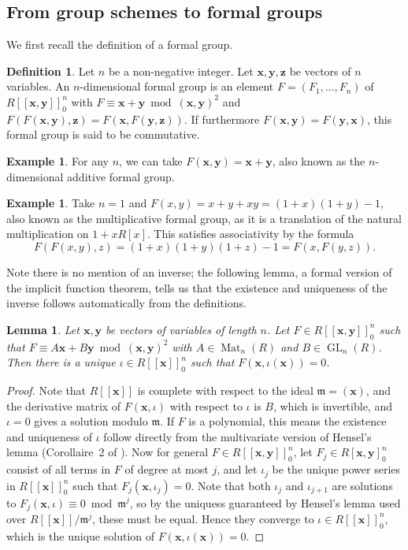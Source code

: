 \documentclass[12pt]{article}
\newcommand{\vx}{\mathbf{x}}
\newcommand{\vy}{\mathbf{y}}
\newcommand{\vz}{\mathbf{z}}
\newcommand{\m}{\mathfrak{m}}
\DeclareMathOperator{\GL}{GL}
\DeclareMathOperator{\Mat}{Mat}
\theoremstyle{plain}
\newtheorem{lem}[thm]{Lemma} %
\theoremstyle{definition}
\newtheorem{defn}[thm]{Definition} %
\newtheorem{exmp}[thm]{Example} %
\theoremstyle{remark}
\begin{document}
\subsection{From group schemes to formal groups}
We first recall the definition of a formal group.
\begin{defn}
\label{defn:formalgroup}
Let $n$ be a non-negative integer. Let $\vx,\vy,\vz$ be vectors of $n$ variables. An $n$-dimensional formal group is an element $F = (F_1,\dots,F_n)$ of $R[[\vx,\vy]]_0^n$ with $F \equiv \vx + \vy \bmod (\vx,\vy)^2$ and $F(F(\vx,\vy),\vz) = F(\vx,F(\vy,\vz))$. If furthermore $F(\vx,\vy) = F(\vy,\vx)$, this formal group is said to be commutative.
\end{defn}
\begin{exmp}
\label{exmp:ganformalgroup}
For any $n$, we can take $F(\vx,\vy) = \vx+ \vy$, also known as the $n$-dimensional additive formal group.
\end{exmp}
\begin{exmp}
\label{exmp:gmformalgroup}
Take $n=1$ and $F(x,y) = x + y + xy = (1+x)(1+y)-1$, also known as the multiplicative formal group, as it is a translation of the natural multiplication on $1 + xR[x]$. This satisfies associativity by the formula \[F(F(x,y),z) = (1+x)(1+y)(1+z)-1 = F(x,F(y,z)).\]
\end{exmp}
Note there is no mention of an inverse; the following lemma, a formal version of the implicit function theorem, tells us that the existence and uniqueness of the inverse follows automatically from the definitions.
\begin{lem}
\label{lem:implicitfunction}
Let $\vx,\vy$ be vectors of variables of length $n$. Let $F \in R[[\vx,\vy]]_0^n$ such that $F \equiv A\vx + B\vy \bmod (\vx,\vy)^2$ with $A \in \Mat_n(R)$ and $B \in \GL_n(R)$. Then there is a unique $\iota \in R[[\vx]]_0^n$ such that $F(\vx,\iota(\vx)) = 0$. 
\end{lem}
\begin{proof}
Note that $R[[\vx]]$ is complete with respect to the ideal $\m = (\vx)$, and the derivative matrix of $F(\vx,\iota)$ with respect to $\iota$ is $B$, which is invertible, and $\iota = 0$ gives a solution modulo $\m$. If $F$ is a polynomial, this means the existence and uniqueness of $\iota$ follow directly from the multivariate version of Hensel's lemma (Corollaire~2 of \cite[III,4.5]{BourbakiCA}).  Now for general $F \in R[[\vx,\vy]]_0^n$, let $F_j \in R[\vx,\vy]_0^n$ consist of all terms in $F$ of degree at most $j$, and let $\iota_j$ be the unique power series in $R[[\vx]]_0^n$ such that $F_j(\vx,\iota_j) = 0$. Note that both $\iota_j$ and $\iota_{j+1}$ are solutions to $F_j(\vx,\iota) \equiv 0 \bmod \m^j$, so by the uniquess guaranteed by Hensel's lemma used over $R[[\vx]]/\m^j$, these must be equal. Hence they converge to $\iota \in R[[\vx]]_0^n$, which is the unique solution of $F(\vx,\iota(\vx)) = 0$.
\end{proof}
\end{document}
